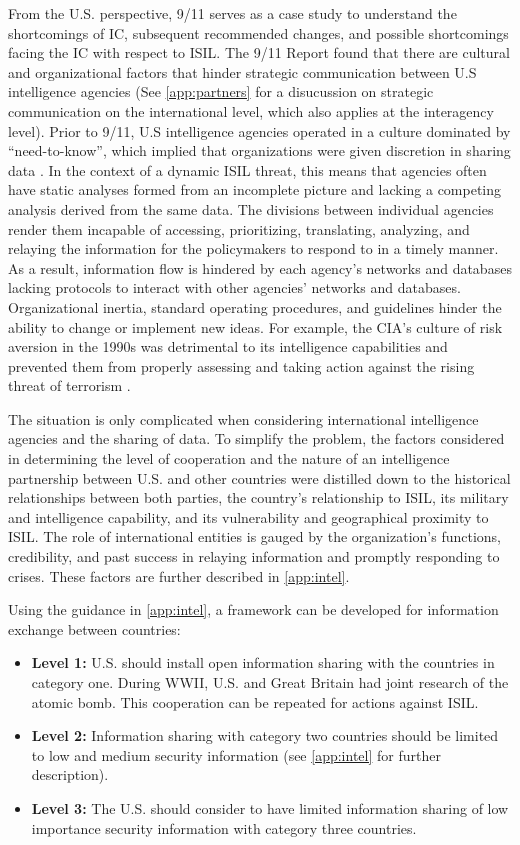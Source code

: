 \documentclass{report}
\begin{document}
From the U.S. perspective, 9/11 serves as a case study to understand the shortcomings of IC, subsequent recommended changes, and possible shortcomings facing the IC with respect to ISIL. The 9/11 Report found that there are cultural and organizational factors that hinder strategic communication between U.S intelligence agencies (See \autoref{app:partners} for a disucussion on strategic communication on the international level, which also applies at the interagency level).  Prior to 9/11, U.S intelligence agencies operated in a culture dominated by \enquote{need-to-know}, which implied that organizations were given discretion in sharing data \cite{McConnell2008}. In the context of a dynamic ISIL threat, this means that agencies often have static analyses formed from an incomplete picture and lacking a competing analysis derived from the same data. The divisions between individual agencies render them incapable of accessing, prioritizing, translating, analyzing, and relaying the information for the policymakers to respond to in a timely manner. As a result, information flow is hindered by each agency's networks and databases lacking protocols to interact with other agencies' networks and databases.  Organizational inertia, standard operating procedures, and guidelines hinder the ability to change or implement new ideas. For example, the CIA's culture of risk aversion in the 1990s was detrimental to its intelligence capabilities and prevented them from properly assessing and taking action against the rising threat of terrorism \cite{Zegart2005}.

The situation is only complicated when considering international intelligence agencies and the sharing of data. To simplify the problem, the factors considered in determining the level of cooperation and the nature of an intelligence partnership between U.S. and other countries were distilled down to the historical relationships between both parties, the country's relationship to ISIL, its military and intelligence capability, and its vulnerability and geographical proximity to ISIL. The role of international entities is gauged by the organization's functions, credibility, and past success in relaying information and promptly responding to crises.  These factors are further described in \autoref{app:intel}. 

Using the guidance in \autoref{app:intel}, a framework can be developed for information exchange between countries: 

\begin{itemize}
  \item \textbf{Level 1:} U.S. should install open information sharing with the countries in category one. During WWII, U.S. and Great Britain had joint research of the atomic bomb. This cooperation can be repeated for actions against ISIL.
  \item \textbf{Level 2:} Information sharing with category two countries should be limited to low and medium security information (see \autoref{app:intel} for further description).  
  \item \textbf{Level 3:} The U.S. should consider to have limited information sharing of low importance security information with category three countries.  
\end{itemize}
\end{document}
